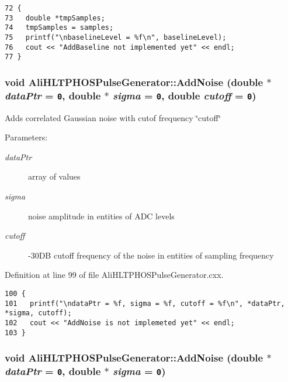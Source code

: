 \footnotesize\begin{verbatim}72 {
73   double *tmpSamples;
74   tmpSamples = samples;
75   printf("\nbaselineLevel = %f\n", baselineLevel);
76   cout << "AddBaseline not implemented yet" << endl;
77 }
\end{verbatim}\normalsize 


\subsubsection{\setlength{\rightskip}{0pt plus 5cm}void Ali\-HLTPHOSPulse\-Generator::Add\-Noise (double $\ast$ {\em data\-Ptr} = {\tt 0}, double $\ast$ {\em sigma} = {\tt 0}, double {\em cutoff} = {\tt 0})}\label{classAliHLTPHOSPulseGenerator_a7}


Adds correlated Gaussian noise with cutof frequency \char`\"{}cutoff\char`\"{} \begin{Desc}
\item[Parameters:]
\begin{description}
\item[{\em data\-Ptr}]array of values \item[{\em sigma}]noise amplitude in entities of ADC levels \item[{\em cutoff}]-30DB cutoff frequency of the noise in entities of sampling frequency \end{description}
\end{Desc}


Definition at line 99 of file Ali\-HLTPHOSPulse\-Generator.cxx.

\footnotesize\begin{verbatim}100 {
101   printf("\ndataPtr = %f, sigma = %f, cutoff = %f\n", *dataPtr, *sigma, cutoff);
102   cout << "AddNoise is not implemeted yet" << endl;
103 }
\end{verbatim}\normalsize 


\subsubsection{\setlength{\rightskip}{0pt plus 5cm}void Ali\-HLTPHOSPulse\-Generator::Add\-Noise (double $\ast$ {\em data\-Ptr} = {\tt 0}, double $\ast$ {\em sigma} = {\tt 0})}\label{classAliHLTPHOSPulseGenerator_a6}


